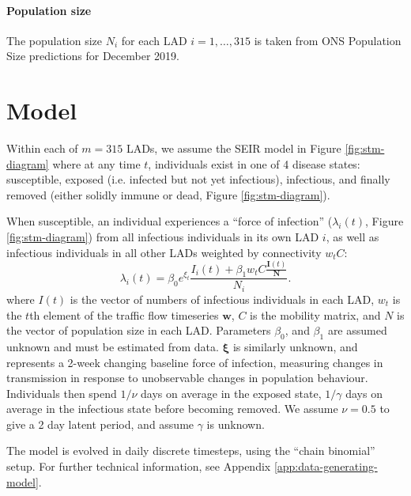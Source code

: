 \documentclass[a4paper]{article}
\begin{document}
\paragraph{Population size}
The population size $N_i$ for each LAD $i=1,\dots,315$ is taken from ONS Population Size predictions for
December 2019.

\section{Model}\label{sec:model}
 Within each of $m=315$ LADs, we assume the SEIR model in Figure \ref{fig:stm-diagram}
 where at any time $t$, individuals exist in one of
4 disease states: susceptible, exposed (i.e. infected but not yet infectious),
infectious, and finally removed (either solidly immune or dead, Figure
\ref{fig:stm-diagram}).

When susceptible, an individual experiences a ``force of infection''
($\lambda_i(t)$, Figure \ref{fig:stm-diagram}) from
all infectious individuals in its own LAD $i$, as well as infectious individuals in all other
LADs weighted by connectivity $w_t C$:
\begin{equation}
  \lambda_i(t) = \beta_0 e^{\xi_t}\frac{ I_i(t) + \beta_1 w_t C \frac{\bm{I}(t)}{\bm{N}}}{N_i}.
\end{equation}
where $I(t)$ is the vector of numbers of infectious individuals in each LAD, $w_t$ is the
$t$th element of the traffic flow timeseries $\bm{w}$, $C$ is the mobility matrix, and $N$ is
the vector of population size in each LAD. Parameters $\beta_0$, and $\beta_1$
are assumed unknown and must be estimated from data.  $\bm{\xi}$ is similarly unknown, and
represents a 2-week changing baseline force of infection, measuring changes in
transmission in response to unobservable changes in population behaviour.  Individuals
then spend $1/\nu$ days on average in the exposed state, $1/\gamma$ days on average in the
infectious state before becoming removed.  We assume $\nu = 0.5$ to give a 2 day latent
period, and assume $\gamma$ is unknown.

The model is evolved in daily discrete timesteps, using the ``chain binomial'' setup.  For further
technical information, see Appendix \ref{app:data-generating-model}.
\end{document}
